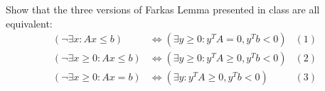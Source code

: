 \usepackage{amsmath}%




    \begin{thm}{}{}
        Show that the three versions of Farkas Lemma presented in class are all equivalent:
        \begin{align*}
            (\neg \exists x: Ax\le b) &\iff (\exists y\ge 0 :y^{T}A=0,y^{T}b<0) &(1)\\
            (\neg \exists x\ge 0: Ax\le b) &\iff (\exists y\ge 0 :y^{T}A\ge 0,y^{T}b<0) &(2)\\
            (\neg \exists x\ge 0: Ax= b) &\iff (\exists y :y^{T}A\ge 0,y^{T}b<0)&(3)
        \end{align*}
    \end{thm}
